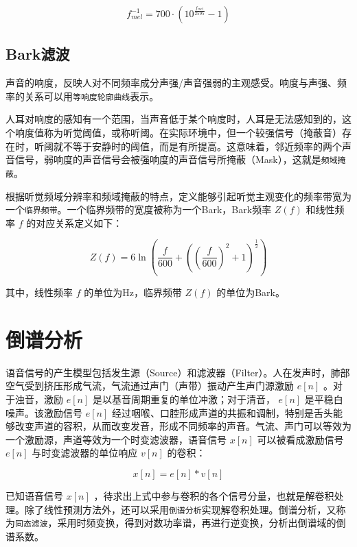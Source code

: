 \documentclass[cn,10pt,math=newtx,citestyle=gb7714-2015,bibstyle=gb7714-2015]{elegantbook}
\begin{document}
\begin{equation}
  f_{mel}^{-1}=700\cdot (10^{\frac{f_{mel}}{2595}}-1)
\end{equation}

\subsection{Bark滤波}

声音的响度，反映人对不同频率成分声强/声音强弱的主观感受。响度与声强、频率的关系可以用\lstinline{等响度轮廓曲线}表示。

人耳对响度的感知有一个范围，当声音低于某个响度时，人耳是无法感知到的，这个响度值称为听觉阈值，或称听阈。在实际环境中，但一个较强信号（掩蔽音）存在时，听阈就不等于安静时的阈值，而是有所提高。这意味着，邻近频率的两个声音信号，弱响度的声音信号会被强响度的声音信号所掩蔽（Mask），这就是\lstinline{频域掩蔽}。

根据听觉频域分辨率和频域掩蔽的特点，定义能够引起听觉主观变化的频率带宽为一个\lstinline{临界频带}。一个临界频带的宽度被称为一个Bark，Bark频率 $Z(f)$ 和线性频率 $f$ 的对应关系定义如下：

\begin{equation}
  Z(f)=6\mathop{ln}(\frac{f}{600}+((\frac{f}{600})^2+1)^{\frac{1}{2}})
\end{equation}

其中，线性频率 $f$ 的单位为Hz，临界频带 $Z(f)$ 的单位为Bark。

\section{倒谱分析}

语音信号的产生模型包括发生源（Source）和滤波器（Filter）。人在发声时，肺部空气受到挤压形成气流，气流通过声门（声带）振动产生声门源激励 $e[n]$ 。对于浊音，激励 $e[n]$ 是以基音周期重复的单位冲激；对于清音， $e[n]$ 是平稳白噪声。该激励信号 $e[n]$ 经过咽喉、口腔形成声道的共振和调制，特别是舌头能够改变声道的容积，从而改变发音，形成不同频率的声音。气流、声门可以等效为一个激励源，声道等效为一个时变滤波器，语音信号 $x[n]$ 可以被看成激励信号 $e[n]$ 与时变滤波器的单位响应 $v[n]$ 的卷积：

\begin{equation}
  x[n]=e[n]*v[n]
\end{equation}

已知语音信号 $x[n]$ ，待求出上式中参与卷积的各个信号分量，也就是解卷积处理。除了线性预测方法外，还可以采用\lstinline{倒谱分析}实现解卷积处理。倒谱分析，又称为\lstinline{同态滤波}，采用时频变换，得到对数功率谱，再进行逆变换，分析出倒谱域的倒谱系数。
\end{document}
